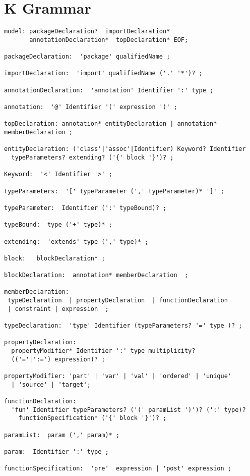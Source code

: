 
\section{K Grammar}
\label{app:grammar}

{\scriptsize 

\begin{verbatim}
model: packageDeclaration?  importDeclaration*  
       annotationDeclaration*  topDeclaration* EOF;

packageDeclaration:  'package' qualifiedName ;

importDeclaration:  'import' qualifiedName ('.' '*')? ;

annotationDeclaration:  'annotation' Identifier ':' type ;

annotation:  '@' Identifier '(' expression ')' ;

topDeclaration: annotation* entityDeclaration | annotation* memberDeclaration ;

entityDeclaration: ('class'|'assoc'|Identifier) Keyword? Identifier 
  typeParameters? extending? ('{' block '}')? ;

Keyword:  '<' Identifier '>' ;

typeParameters:  '[' typeParameter (',' typeParameter)* ']' ;

typeParameter:  Identifier (':' typeBound)? ;

typeBound:  type ('+' type)* ;
      
extending:  'extends' type (',' type)* ;

block:   blockDeclaration* ;

blockDeclaration:  annotation* memberDeclaration  ;

memberDeclaration:
 typeDeclaration  | propertyDeclaration  | functionDeclaration
 | constraint | expression  ;

typeDeclaration:  'type' Identifier (typeParameters? '=' type )? ;

propertyDeclaration:
  propertyModifier* Identifier ':' type multiplicity? 
  (('='|':=') expression)? ;

propertyModifier: 'part' | 'var' | 'val' | 'ordered' | 'unique' 
  | 'source' | 'target';

functionDeclaration:
  'fun' Identifier typeParameters? ('(' paramList ')')? (':' type)?
    functionSpecification* ('{' block '}')? ;

paramList:  param (',' param)* ;

param:  Identifier ':' type ;

functionSpecification:  'pre'  expression | 'post' expression ;


\end{verbatim}}
